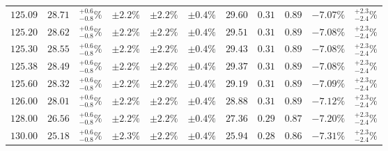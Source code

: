 \begin{table}[ht!]
{{\begin{tabular}{| cc | c | ccc | cccc | c |}
$125.09$ & $28.71$ & $^{+0.6}_{-0.8}\%$ & $\pm 2.2\%$ & {\color{black!55}$\pm 2.2\%$} & {\color{black!55}$\pm 0.4\%$} & $29.60$ & $0.31$ & $0.89$ & $-7.07\%$ & $^{+2.3}_{-2.4}\%$ \\
$125.20$ & $28.62$ & $^{+0.6}_{-0.8}\%$ & $\pm 2.2\%$ & {\color{black!55}$\pm 2.2\%$} & {\color{black!55}$\pm 0.4\%$} & $29.51$ & $0.31$ & $0.89$ & $-7.08\%$ & $^{+2.3}_{-2.4}\%$ \\
$125.30$ & $28.55$ & $^{+0.6}_{-0.8}\%$ & $\pm 2.2\%$ & {\color{black!55}$\pm 2.2\%$} & {\color{black!55}$\pm 0.4\%$} & $29.43$ & $0.31$ & $0.89$ & $-7.08\%$ & $^{+2.3}_{-2.4}\%$ \\
$125.38$ & $28.49$ & $^{+0.6}_{-0.8}\%$ & $\pm 2.2\%$ & {\color{black!55}$\pm 2.2\%$} & {\color{black!55}$\pm 0.4\%$} & $29.37$ & $0.31$ & $0.89$ & $-7.08\%$ & $^{+2.3}_{-2.4}\%$ \\
$125.60$ & $28.32$ & $^{+0.6}_{-0.8}\%$ & $\pm 2.2\%$ & {\color{black!55}$\pm 2.2\%$} & {\color{black!55}$\pm 0.4\%$} & $29.19$ & $0.31$ & $0.89$ & $-7.09\%$ & $^{+2.3}_{-2.4}\%$ \\
$126.00$ & $28.01$ & $^{+0.6}_{-0.8}\%$ & $\pm 2.2\%$ & {\color{black!55}$\pm 2.2\%$} & {\color{black!55}$\pm 0.4\%$} & $28.88$ & $0.31$ & $0.89$ & $-7.12\%$ & $^{+2.3}_{-2.4}\%$ \\
$128.00$ & $26.56$ & $^{+0.6}_{-0.8}\%$ & $\pm 2.2\%$ & {\color{black!55}$\pm 2.2\%$} & {\color{black!55}$\pm 0.4\%$} & $27.36$ & $0.29$ & $0.87$ & $-7.20\%$ & $^{+2.3}_{-2.4}\%$ \\
$130.00$ & $25.18$ & $^{+0.6}_{-0.8}\%$ & $\pm 2.3\%$ & {\color{black!55}$\pm 2.2\%$} & {\color{black!55}$\pm 0.4\%$} & $25.94$ & $0.28$ & $0.86$ & $-7.31\%$ & $^{+2.3}_{-2.4}\%$ \\
\cline{1-11}
\end{tabular}
}
}
\end{table}

